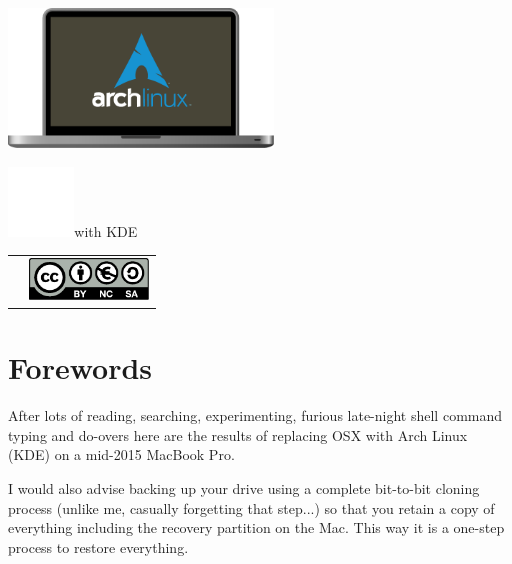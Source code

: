 \vspace*{\fill}
\includegraphics[height=10em]{img/ArchMBP.pdf}\linebreak
\begin{mdframed}[style=titlebox]
	\centering
	\begin{Huge}
		\par
	\end{Huge}
\end{mdframed}
\vspace*{2em}
\includegraphics[height=5em]{img/kde-logo.pdf}with KDE\par
\vspace*{\fill}
\begin{tabularx}{0.95\textwidth}{lR}
	& \includegraphics[height=3em]{../common/licenses/by-nc-sa_eu.pdf}
\end{tabularx}
\vspace*{2em}

\setcounter{page}{1}
\pagecolor{white}
\color{dark}
\normalsize\justify
\tableofcontents
\clearpage

\section{Forewords}

After lots of reading, searching, experimenting, furious late-night shell command typing and 
do-overs here are the results of replacing OSX with Arch Linux (KDE) on a mid-2015 MacBook Pro. 

I would also advise backing up your drive using a complete bit-to-bit cloning process (unlike me, casually forgetting that step...) so that you retain a copy of everything including the recovery partition on the Mac. This way it is a one-step process to restore everything.

